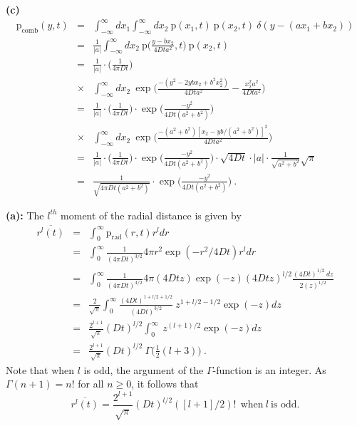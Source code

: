 \textbf{(c)} 
\begin{eqnarray}
\text{p}_\text{comb}(y, t) &=& \int_{-\infty}^{\infty} dx_1  \int_{-\infty}^{\infty} dx_2 ~ \text{p}(x_1, t)~\text{p}(x_2, t)~\delta(y - (a x_1 + b x_2)) \nonumber \\
&=& \frac{1}{|a|}\int_{-\infty}^{\infty} dx_2 ~ \text{p}\bigg(\frac{y-b x_2}{4 D t a^2}, t\bigg)~\text{p}(x_2, t) \nonumber \\
&=&  \frac{1}{|a|} \cdot \bigg(\frac{1}{4 \pi D t}\bigg) \nonumber \\
&\times& \int_{-\infty}^{\infty} dx_2 ~ \exp\bigg( \frac{-(y^2 - 2 y b x_2 + b^2 x_2^2)}{4 D t a^2} - \frac{x_2^2 a^2}{4 D t a^2}
\bigg) \nonumber \\
&=& \frac{1}{|a|} \cdot \bigg(\frac{1}{4 \pi D t}\bigg) \cdot \exp\bigg( \frac{-y^2}{4 D t (a^2 + b^2)}\bigg) \nonumber \\
&\times& \int_{-\infty}^{\infty} dx_2 ~ \exp\bigg( \frac{-(a^2 + b^2) [x_2 - y b /(a^2 +b^2)]^2}{4 D t a^2} \bigg) \nonumber \\
&=& \frac{1}{|a|} \cdot \bigg(\frac{1}{4 \pi D t}\bigg)  \cdot \exp\bigg( \frac{-y^2}{4 D t (a^2 + b^2)}\bigg) \cdot \sqrt{4 D t} \cdot |a| \cdot \frac{1}{\sqrt{a^2 + b^2}} \sqrt{\pi} \nonumber \\
&=& \boxed{\frac{1}{\sqrt{4 \pi D t (a^2 + b^2)}} \cdot \exp\bigg( \frac{-y^2}{4 D t (a^2 + b^2)}\bigg)}~.
\end{eqnarray}

\textbf{(a):} The $l^{th}$ moment of the radial distance is given by
\begin{eqnarray}
\overline{r^l(t)} &=& \int_{0}^{\infty} \text{p}_\text{rad}(r, t) r^l dr \nonumber \\
&=&  \int_{0}^{\infty} \frac{1}{(4 \pi D t)^{3/2}} 4 \pi r^2 \exp(-r^2/4Dt) r^l dr \nonumber \\
&=&  \int_{0}^{\infty} \frac{1}{(4 \pi D t)^{3/2}} 4 \pi (4 D t z) \exp(-z) (4 D t z)^{l/2} \frac{(4 D t)^{1/2} ~dz}{2 (z)^{1/2}} \nonumber \\
&=&  \frac{2}{\sqrt{\pi}} \int_{0}^{\infty} \frac{(4 D t)^{1+l/2+1/2}}{(4 D t)^{3/2}}~ z^{1+l/2-1/2} \exp(-z) dz \nonumber \\
&=& \frac{2^{l+1}}{\sqrt{\pi}} (D t)^{l/2} \int_{0}^{\infty}~ z^{(l+1)/2} \exp(-z) dz \nonumber \\
&=& \boxed{\frac{2^{l+1}}{\sqrt{\pi}} (D t)^{l/2}~\Gamma\bigg(\frac{1}{2}(l+3)\bigg)}~.
\end{eqnarray}
Note that when $l$ is odd, the argument of the $\Gamma$-function is an integer. As $\Gamma(n+1) = n!$ for all $n \geq 0 $, it follows that 
\begin{equation}
\boxed{ \overline{r^l(t)} = \frac{2^{l+1}}{\sqrt{\pi}} (D t)^{l/2} ([l+1]/2)!~~\text{when}~l~\text{is odd.}} \label{eq:odd_radial_moments}
\end{equation}

